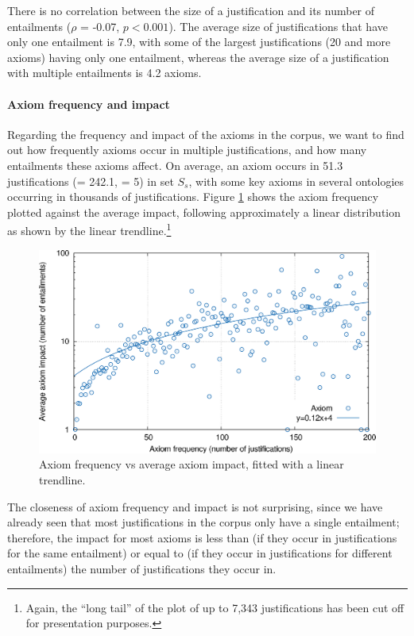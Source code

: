 There is no correlation between the size of a justification and its number of entailments ($\rho$ = -0.07, $p < 0.001$). The average size of justifications that have only one entailment is 7.9, with some of the largest justifications (20 and more axioms) having only one entailment, whereas the average size of a justification with multiple entailments is 4.2 axioms.


\paragraph{Axiom frequency and impact}

Regarding the frequency and impact of the axioms in the corpus, we want to find out how frequently axioms occur in multiple justifications, and how many entailments these axioms affect. On average, an axiom occurs in 51.3 justifications (\sdev = 242.1, \median = 5) in set $S_{s}$, with some key axioms in several ontologies occurring in thousands of justifications. Figure \ref{fig:arityimpact} shows the axiom frequency plotted against the average impact, following approximately a linear distribution as shown by the linear trendline.\footnote{Again, the \enquote{long tail} of the plot of up to 7,343 justifications has been cut off for presentation purposes.} 

\begin{figure}[tb]
\centering
\includegraphics[width=14cm]{plots/arityimpact.pdf}
\caption[Axiom frequency vs average axiom impact.]{Axiom frequency vs average axiom impact, fitted with a linear trendline.}
\label{fig:arityimpact}
\end{figure}

The closeness of axiom frequency and impact is not surprising, since we have already seen that most justifications in the corpus only have a single entailment; therefore, the impact for most axioms is less than (if they occur in justifications for the same entailment) or equal to (if they occur in justifications for different entailments) the number of justifications they occur in. 

